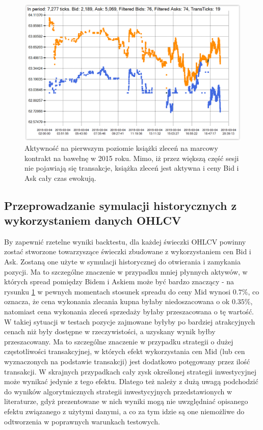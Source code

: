 \documentclass[a4paper,12pt,openany, DIV=calc, headsepline]{scrbook}
\begin{document}
\begin{figure}[H]
  \centering
  \includegraphics[scale=0.5]{wykresy/cottonOrderH.PNG}
  \caption{Aktywność na pierwszym poziomie książki zleceń na marcowy kontrakt na bawełnę w 2015 roku. Mimo, iż przez większą część sesji nie pojawiają się transakcje, książka zleceń jest aktywna i ceny Bid i Ask cały czas ewokują.}
  \label{fig:cottonOrder}
\end{figure}

\subsection{Przeprowadzanie symulacji historycznych z wykorzystaniem danych OHLCV}


By zapewnić rzetelne wyniki backtestu, dla każdej świeczki OHLCV powinny zostać stworzone towarzyszące świeczki zbudowane z wykorzystaniem cen Bid i Ask. Zostaną one użyte w symulacji historycznej do otwierania i zamykania pozycji. Ma to szczególne znaczenie w przypadku mniej płynnych aktywów, w których spread pomiędzy Bidem i Askiem może być bardzo znaczący - na rysunku \ref{fig:cottonOrder} w pewnych momentach stosunek spreadu do ceny Mid wynosi $0.7\%$, co oznacza, że cena wykonania zlecania kupna byłaby niedoszacowana o ok $0.35\%$, natomiast cena wykonania zleceń sprzedaży byłaby przeszacowana o tę wartość. W takiej sytuacji w testach pozycje zajmowane byłyby po bardziej atrakcyjnych cenach niż były dostępne w rzeczywistości, a uzyskany wynik byłby przeszacowany. Ma to szczególne znaczenie w przypadku strategii o dużej częstotliwości transakcyjnej, w których efekt wykorzystania cen Mid (lub cen wyznaczonych na podstawie transakcji) jest dodatkowo potęgowany przez ilość transakcji. W skrajnych przypadkach cały zysk określonej strategii inwestycyjnej może wynikać jedynie z tego efektu. Dlatego też należy z dużą uwagą podchodzić do wyników algorytmicznych strategii inwestycyjnych przedstawionych w literaturze, gdyż prezentowane w nich wyniki mogą nie uwzględniać opisanego efektu związanego z użytymi danymi, a co za tym idzie są one niemożliwe do odtworzenia w poprawnych warunkach testowych. 
\end{document}
